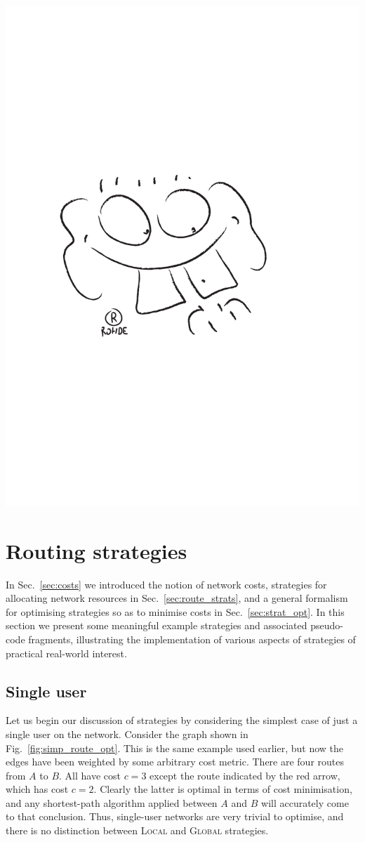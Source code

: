 \documentclass[aps, rmp, twocolumn, amsmath, amssymb, nofootinbib, superscriptaddress, longbibliography, floatfix, table-of-contents, eqsecnum]{revtex4-1}
\newcommand{\comment}[1]{{\color{blue}{\textbf{#1}}}}
\begin{document}
\comment{To do}

\begin{center}
	\includegraphics[width=0.6\columnwidth]{sketch_14}
\end{center}

%
%

\section{Routing strategies} \label{sec:strategies} 

In Sec.~\ref{sec:costs} we introduced the notion of network costs, strategies for allocating network resources in Sec.~\ref{sec:route_strats}, and a general formalism for optimising strategies so as to minimise costs in Sec.~\ref{sec:strat_opt}. In this section we present some meaningful example strategies and associated pseudo-code fragments, illustrating the implementation of various aspects of strategies of practical real-world interest.

%
%

\subsection{Single user} \label{sec:single_user_shortest} 

Let us begin our discussion of strategies by considering the simplest case of just a single user on the network. Consider the graph shown in Fig.~\ref{fig:simp_route_opt}. This is the same example used earlier, but now the edges have been weighted by some arbitrary cost metric. There are four routes from $A$ to $B$. All have cost \mbox{$c=3$} except the route indicated by the red arrow, which has cost \mbox{$c=2$}. Clearly the latter is optimal in terms of cost minimisation, and any shortest-path algorithm applied between $A$ and $B$ will accurately come to that conclusion. Thus, single-user networks are very trivial to optimise, and there is no distinction between \textsc{Local} and \textsc{Global} strategies.
\end{document}
